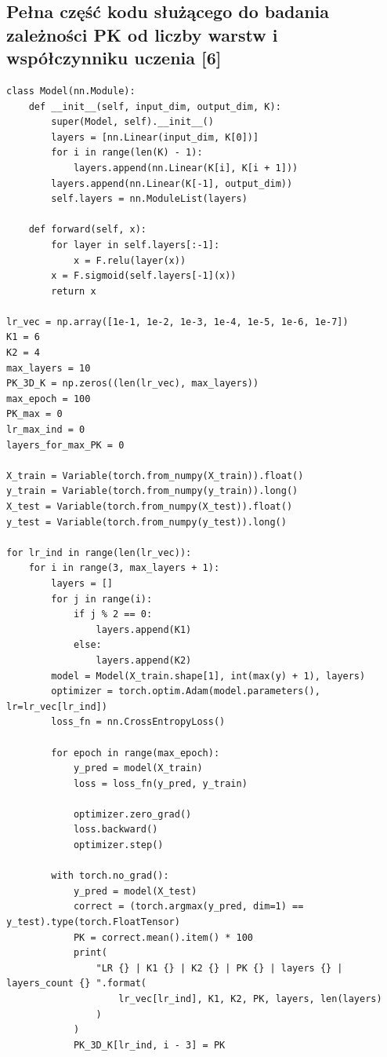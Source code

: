 \documentclass[a4paper]{article}
\begin{document}
\newpage
\subsection{Pełna część kodu służącego do badania zależności PK od liczby warstw i współczynniku uczenia [6]}
\begin{verbatim}
class Model(nn.Module):
    def __init__(self, input_dim, output_dim, K):
        super(Model, self).__init__()
        layers = [nn.Linear(input_dim, K[0])]
        for i in range(len(K) - 1):
            layers.append(nn.Linear(K[i], K[i + 1]))
        layers.append(nn.Linear(K[-1], output_dim))
        self.layers = nn.ModuleList(layers)

    def forward(self, x):
        for layer in self.layers[:-1]:
            x = F.relu(layer(x))
        x = F.sigmoid(self.layers[-1](x))
        return x

lr_vec = np.array([1e-1, 1e-2, 1e-3, 1e-4, 1e-5, 1e-6, 1e-7])
K1 = 6
K2 = 4
max_layers = 10
PK_3D_K = np.zeros((len(lr_vec), max_layers))
max_epoch = 100
PK_max = 0
lr_max_ind = 0
layers_for_max_PK = 0

X_train = Variable(torch.from_numpy(X_train)).float()
y_train = Variable(torch.from_numpy(y_train)).long()
X_test = Variable(torch.from_numpy(X_test)).float()
y_test = Variable(torch.from_numpy(y_test)).long()

for lr_ind in range(len(lr_vec)):
    for i in range(3, max_layers + 1):
        layers = []
        for j in range(i):
            if j % 2 == 0:
                layers.append(K1)
            else:
                layers.append(K2)
        model = Model(X_train.shape[1], int(max(y) + 1), layers)
        optimizer = torch.optim.Adam(model.parameters(), lr=lr_vec[lr_ind])
        loss_fn = nn.CrossEntropyLoss()

        for epoch in range(max_epoch):
            y_pred = model(X_train)
            loss = loss_fn(y_pred, y_train)

            optimizer.zero_grad()
            loss.backward()
            optimizer.step()

        with torch.no_grad():
            y_pred = model(X_test)
            correct = (torch.argmax(y_pred, dim=1) == y_test).type(torch.FloatTensor)
            PK = correct.mean().item() * 100
            print(
                "LR {} | K1 {} | K2 {} | PK {} | layers {} | layers_count {} ".format(
                    lr_vec[lr_ind], K1, K2, PK, layers, len(layers)
                )
            )
            PK_3D_K[lr_ind, i - 3] = PK


\end{verbatim}
\end{document}
